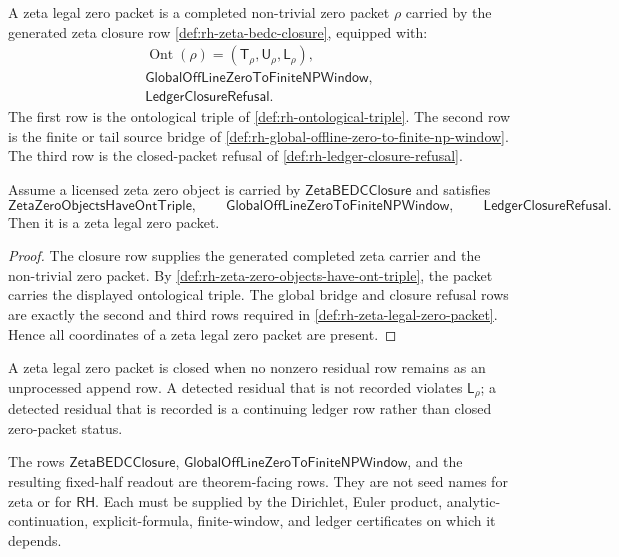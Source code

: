 \begin{definition}
\label{def:rh-zeta-legal-zero-packet}
A zeta legal zero packet is a completed non-trivial zero packet $\rho$
carried by the generated zeta closure row
\autoref{def:rh-zeta-bedc-closure}, equipped with:
$$
\begin{gathered}
\operatorname{Ont}(\rho)=(\mathsf T_\rho,\mathsf U_\rho,\mathsf L_\rho),\\
\mathsf{GlobalOffLineZeroToFiniteNPWindow},\\
\mathsf{LedgerClosureRefusal}.
\end{gathered}
$$
The first row is the ontological triple of
\autoref{def:rh-ontological-triple}.  The second row is the finite or
tail source bridge of
\autoref{def:rh-global-offline-zero-to-finite-np-window}.  The third
row is the closed-packet refusal of \autoref{def:rh-ledger-closure-refusal}.
\end{definition}

\begin{theorem}
\label{thm:rh-licensed-triple-gives-legal-zero-packet}
Assume a licensed zeta zero object is carried by
$\mathsf{ZetaBEDCClosure}$ and satisfies
$$
\mathsf{ZetaZeroObjectsHaveOntTriple},
\qquad
\mathsf{GlobalOffLineZeroToFiniteNPWindow},
\qquad
\mathsf{LedgerClosureRefusal}.
$$
Then it is a zeta legal zero packet.
\end{theorem}

\begin{proof}
The closure row supplies the generated completed zeta carrier and the
non-trivial zero packet.  By
\autoref{def:rh-zeta-zero-objects-have-ont-triple}, the packet carries
the displayed ontological triple.  The global bridge and closure refusal
rows are exactly the second and third rows required in
\autoref{def:rh-zeta-legal-zero-packet}.  Hence all coordinates of a
zeta legal zero packet are present.
\end{proof}

\begin{definition}
\label{def:rh-closed-zeta-zero-packet}
A zeta legal zero packet is closed when no nonzero residual row remains
as an unprocessed append row.  A detected residual that is not recorded
violates $\mathsf L_\rho$; a detected residual that is recorded is a
continuing ledger row rather than closed zero-packet status.
\end{definition}

\begin{principle}
\label{prin:rh-zeta-shaped-statements-theorem-targets}
The rows $\mathsf{ZetaBEDCClosure}$,
$\mathsf{GlobalOffLineZeroToFiniteNPWindow}$, and the resulting
fixed-half readout are theorem-facing rows.  They are not seed names for
zeta or for $\mathsf{RH}$.  Each must be supplied by the Dirichlet,
Euler product, analytic-continuation, explicit-formula, finite-window,
and ledger certificates on which it depends.
\end{principle}

